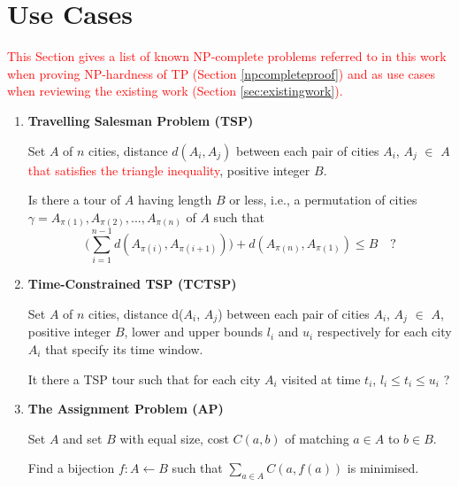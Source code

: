 \documentclass{article}
\theoremstyle{definition}
\begin{document}

\section{Use Cases}
\label{npcompleteproblems}

\textcolor{red}{This Section gives a list of known NP-complete problems \citep{thebible} referred to in this work when proving NP-hardness of TP (Section \ref{npcompleteproof}) and as use cases when reviewing the existing work (Section \ref{sec:existingwork}).}

\begin{enumerate}
\item \textbf{Travelling Salesman Problem (TSP)}

\begin{instance}
Set $A$ of $n$ cities, distance $d(A_{i}, A_{j})$ between each pair of cities $A_{i}$, $A_{j}$ $\in$ $A$ \textcolor{red}{that satisfies the triangle inequality}, positive integer $B$.
\end{instance}

\begin{question}
Is there a tour of $A$ having length $B$ or less, i.e., a permutation of cities $\gamma = A_{\pi(1)}, A_{\pi(2)},...,A_{\pi(n)}$ of $A$ such that
$$\bigg( \sum_{i=1}^{n-1} d(A_{\pi(i)}, A_{\pi(i+1)}) \bigg) + d(A_{\pi(n)}, A_{\pi(1)}) \leq B \quad \textrm{?}$$
\end{question}

\item \textbf{Time-Constrained TSP (TCTSP)}

\begin{instance}
Set $A$ of $n$ cities, distance d($A_{i}$, $A_{j}$) between each pair of cities $A_{i}$, $A_{j}$ $\in$ $A$, positive integer $B$, lower and upper bounds $l_{i}$ and $u_{i}$ respectively for each city $A_{i}$ that specify its time window.
\end{instance}

\begin{question}
It there a TSP tour such that for each city $A_{i}$ visited at time $t_{i}$, $l_{i} \leq t_{i} \leq u_{i}$ ?
\end{question}

\item \textbf{The Assignment Problem (AP)}

\begin{instance}
Set $A$ and set $B$ with equal size, cost $C(a,b)$ of matching $a \in A$ to $b \in B$.
\end{instance}

\begin{question}
Find a bijection $f: A \gets B$ such that $\sum_{a\in A} C(a,f(a))$ is minimised.
\end{question}
\end{enumerate}
\end{document}
